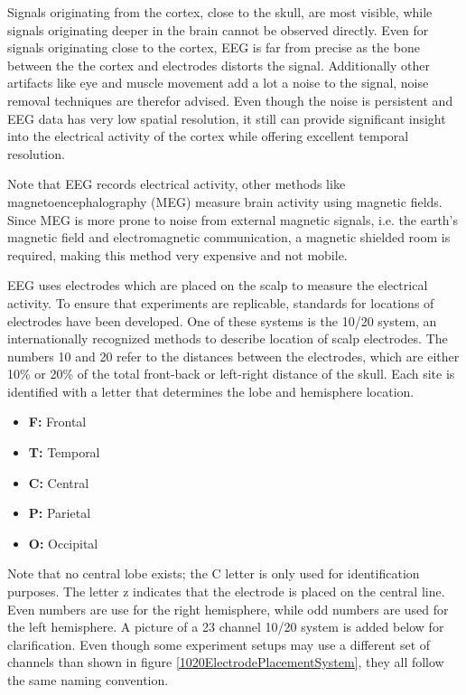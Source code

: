 \npar

Signals originating from the cortex, close to the skull, are most visible, while signals originating deeper in the brain cannot be observed directly. Even for signals originating close to the cortex, EEG is far from precise as the bone between the the cortex and electrodes distorts the signal. Additionally other artifacts like eye and muscle movement add a lot a noise to the signal, noise removal techniques are therefor advised. Even though the noise is persistent and EEG data has very low spatial resolution, it still can provide significant insight into the electrical activity of the cortex while offering excellent temporal resolution\cite{GivenPaper}.

\npar

Note that EEG records electrical activity, other methods like magnetoencephalography (MEG) measure brain activity using magnetic fields. Since MEG is more prone to noise from external magnetic signals, i.e. the earth's magnetic field and electromagnetic communication, a magnetic shielded room is required, making this method very expensive and not mobile. 

\npar

EEG uses electrodes which are placed on the scalp to measure the electrical activity. To ensure that experiments are replicable, standards for locations of electrodes have been developed. One of these systems is the 10/20 system, an internationally recognized methods to describe location of scalp electrodes\cite{TenTwentyManual}. The numbers 10 and 20 refer to the distances between the electrodes, which are either 10\% or 20\% of the total front-back or left-right distance of the skull. Each site is identified with a letter that determines the lobe and hemisphere location.
\begin{itemize}
\item \textbf{F:} Frontal
\item \textbf{T:} Temporal
\item \textbf{C:} Central
\item \textbf{P:} Parietal
\item \textbf{O:} Occipital
\end{itemize}
Note that no central lobe exists; the C letter is only used for identification purposes. The letter z indicates that the electrode is placed on the central line. Even numbers are use for the right hemisphere, while odd numbers are used for the left hemisphere. A picture of a 23 channel 10/20 system is added below for clarification. Even though some experiment setups may use a different set of channels than shown in figure \ref{1020ElectrodePlacementSystem}, they all follow the same naming convention.

